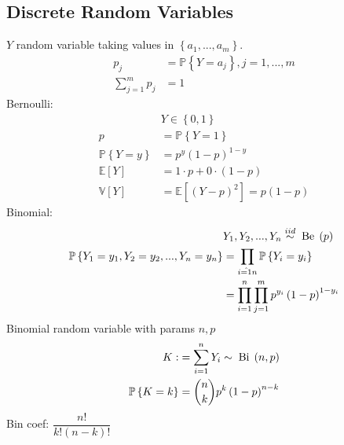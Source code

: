 \documentclass{article}
\begin{document}
\subsection{Discrete Random Variables}
$Y $ random variable taking values in $\left\{a_{1}, ..., a_{m}\right\}$.
\begin{align*}
p_{j} &= \mathbb{P}\left\{Y = a_{j}\right\}, j = 1, ..., m 
\\ \displaystyle\sum_{j=1}^{m} p_{j} &= 1
\end{align*}
Bernoulli:
\begin{align*}
&Y \in \left\{0, 1\right\}
\\ p &= \mathbb{P}\left\{Y = 1\right\}
\\ \mathbb{P}\left\{Y = y\right\} &= p^{y} \left(1 - p\right)^{1-y}
\\ \mathbb{E}\left[Y\right] &= 1 \cdot  p + 0 \cdot  \left(1 - p\right)
\\ \mathbb{V}\left[Y\right] &= \mathbb{E}\left[\left(Y - p\right)^{2}\right] = p \left(1 - p\right)
\end{align*}
Binomial:
\begin{align*}
&Y_{1}, Y_{2}, ..., Y_{n} \stackrel{iid}{\sim} \text{\;Be\;}\left(p\right)
\\ \mathbb{P}\left\{Y_{1} = y_{1}, Y_{2}  = y_{2}, ..., Y_{n} = y_{n}\right\} &= \displaystyle\prod_{i\hat{=1}n} \mathbb{P}\left\{Y_{i} = y_{i}\right\}
\\ &= \displaystyle\prod_{i=1}^{n} \displaystyle\prod_{j=1}^{m} p^{y_{i}} \left(1 - p\right)^{1 - y_{i}}
\end{align*}
Binomial random variable with params $n , p $
\begin{align*}
K  :&= \displaystyle\sum_{i=1}^{n} Y_{i} \sim  \text{\;Bi\;}\left(n, p\right)
\\ \mathbb{P}\left\{K = k\right\} &= \dbinom{n}{k} p^{k} \left(1 - p\right)^{n-k}
\end{align*}
Bin coef: $\dfrac{n!}{k! \left(n-k\right)!}$
\end{document}
